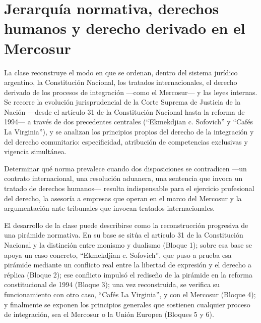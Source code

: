 \documentclass[12pt,oneside]{book}
\begin{document}
\tableofcontents


\chapter[Jerarquía normativa y derecho derivado]{Jerarquía normativa, derechos humanos y derecho derivado en el Mercosur}

La clase reconstruye el modo en que se ordenan, dentro del sistema jurídico argentino, la Constitución Nacional, los tratados internacionales, el derecho derivado de los procesos de integración —como el Mercosur— y las leyes internas. Se recorre la evolución jurisprudencial de la Corte Suprema de Justicia de la Nación —desde el artículo 31 de la Constitución Nacional hasta la reforma de 1994— a través de dos precedentes centrales (``Ekmekdjian c. Sofovich'' y ``Cafés La Virginia''), y se analizan los principios propios del derecho de la integración y del derecho comunitario: especificidad, atribución de competencias exclusivas y vigencia simultánea.

Determinar qué norma prevalece cuando dos disposiciones se contradicen —un contrato internacional, una resolución aduanera, una sentencia que invoca un tratado de derechos humanos— resulta indispensable para el ejercicio profesional del derecho, la asesoría a empresas que operan en el marco del Mercosur y la argumentación ante tribunales que invocan tratados internacionales.

El desarrollo de la clase puede describirse como la reconstrucción progresiva de una pirámide normativa. En su base se sitúa el artículo 31 de la Constitución Nacional y la distinción entre monismo y dualismo (Bloque 1); sobre esa base se apoya un caso concreto, ``Ekmekdjian c. Sofovich'', que puso a prueba esa pirámide mediante un conflicto real entre la libertad de expresión y el derecho a réplica (Bloque 2); ese conflicto impulsó el rediseño de la pirámide en la reforma constitucional de 1994 (Bloque 3); una vez reconstruida, se verifica su funcionamiento con otro caso, ``Cafés La Virginia'', y con el Mercosur (Bloque 4); y finalmente se exponen los principios generales que sostienen cualquier proceso de integración, sea el Mercosur o la Unión Europea (Bloques 5 y 6).
\end{document}
